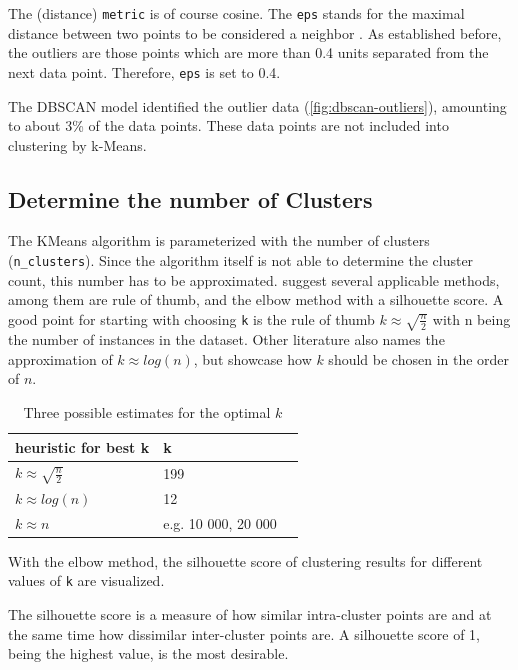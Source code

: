 The (distance) \lstinline|metric| is of course cosine. The \lstinline|eps| stands for the maximal distance between two points to be considered a neighbor \cite{SklearnClusterDBSCAN}. As established before, the outliers are those points which are more than 0.4 units separated from the next data point. Therefore, \lstinline|eps| is set to 0.4. 

The \ac{DBSCAN} model identified the outlier data (\ref{fig:dbscan-outliers}), amounting to about 3\% of the data points. These data points are not included into clustering by k-Means.

\subsection{Determine the number of Clusters}
The KMeans algorithm is parameterized with the number of clusters (\lstinline|n_clusters|). Since the algorithm itself is not able to determine the cluster count, this number has to be approximated.
\cite{kodinariyaReviewDeterminingCluster2013} suggest several applicable methods, among them are rule of thumb, and the elbow method with a silhouette score.
A good point for starting with choosing \lstinline|k| is the rule of thumb $k \approx \sqrt{\frac{n}{2}}$ with n being the number of instances in the dataset. Other literature also names the approximation of $k \approx log(n)$, but \cite{maierOptimalConstructionKnearest2009} showcase how $k$ should be chosen in the order of $n$. 

\begin{table}[!h]
	\centering
	
	\begin{tabular}{l|ll}
		\toprule
		heuristic for best k                         & k &  \\
		\midrule
		$k \approx \sqrt{\frac{n}{2}}$ &  199 &  \\
		$k \approx log(n)$             & 12   &  \\
		$k \approx n$                  &  e.g. 10 000, 20 000& 
	\end{tabular}
\caption{Three possible estimates for the optimal $k$}
\label{table:heuristic-k}
\end{table}

With the elbow method, the silhouette score of clustering results for different values of \lstinline|k| are visualized. 

The silhouette score is a measure of how similar intra-cluster points are and at the same time how dissimilar inter-cluster points are. A silhouette score of 1, being the highest value, is the most desirable.


